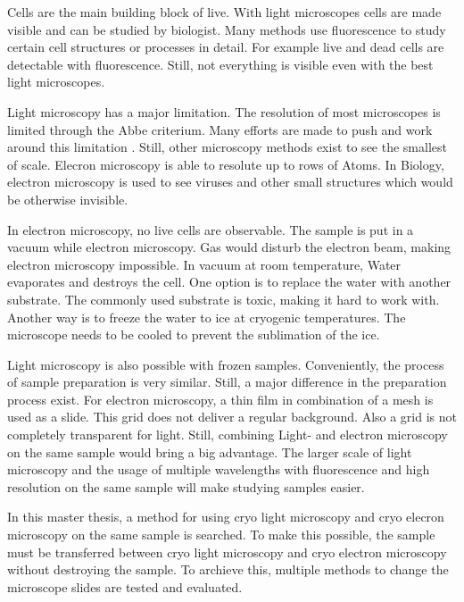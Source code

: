 

Cells are the main building block of live. With light microscopes cells are made visible and can be studied by biologist. Many methods use fluorescence to study certain cell structures or processes in detail. For example live and dead cells are detectable with fluorescence. Still, not everything is visible even with the best light microscopes.

Light microscopy has a major limitation. The resolution of most microscopes is limited through the Abbe criterium. Many efforts are made to push and work around this limitation \cite{Heintzmann.2006}. Still, other microscopy methods exist to see the smallest of scale. Elecron microscopy is able to resolute up to rows of Atoms. In Biology, electron microscopy is used to see viruses and other small structures which would be otherwise invisible. 

In electron microscopy, no live cells are observable. The sample is put in a vacuum while electron microscopy. Gas would disturb the electron beam, making electron microscopy impossible. In vacuum at room temperature, Water evaporates and destroys the cell. One option is to replace the water with another substrate. The commonly used substrate is toxic, making it hard to work with. Another way is to freeze the water to ice at cryogenic temperatures. The microscope needs to be cooled to prevent the sublimation of the ice.

Light microscopy is also possible with frozen samples. Conveniently, the process of sample preparation is very similar. Still, a major difference in the preparation process exist. For electron microscopy, a thin film in combination of a mesh is used as a slide. This grid does not deliver a regular background. Also a grid is not completely transparent for light. Still, combining Light- and electron microscopy on the same sample would bring a big advantage. The larger scale of light microscopy and the usage of multiple wavelengths with fluorescence and high resolution on the same sample will make studying samples easier.

In this master thesis, a method for using cryo light microscopy and cryo elecron microscopy on the same sample is searched. To make this possible, the sample must be transferred between cryo light microscopy and cryo electron microscopy without destroying the sample. To archieve this, multiple methods to change the microscope slides are tested and evaluated.

